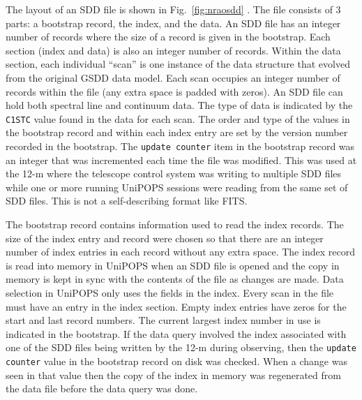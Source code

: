 \documentclass[final,authoryear,5p,times,twocolumn]{elsarticle}
\begin{document}
The layout of an SDD file is shown in Fig.~\ref{fig:nraosdd}
\citep[see also][]{UNIPOPS}.  The file consists of 3 parts: a
bootstrap record, the index, and the data.  An SDD file has an integer
number of records where the size of a record is given in the
bootstrap.  Each section (index and data) is also an integer number of
records.  Within the data section, each individual ``scan'' is one
instance of the data structure that evolved from the original GSDD
data model.  Each scan occupies an integer number of records within
the file (any extra space is padded with zeros).  An SDD file can hold
both spectral line and continuum data.  The type of data is indicated
by the \texttt{C1STC} value found in the data for each scan. The order
and type of the values in the bootstrap record and within each index
entry are set by the version number recorded in the bootstrap.  
The \texttt{update counter} item in the bootstrap record was an integer that
was incremented each time the file was modified.  This was used at the
12-m where the telescope control system was writing to multiple SDD files
while one or more running UniPOPS sessions were reading from the same
set of SDD files.  This is not a self-describing format like FITS.

The bootstrap record contains information used to read the index
records.  The size of the index entry and record were chosen so that
there are an integer number of index entries in each record without
any extra space.  The index record is read into memory in UniPOPS when
an SDD file is opened and the copy in memory is kept in sync with the
contents of the file as changes are made.  Data selection in UniPOPS
only uses the fields in the index.  Every scan in the file must have
an entry in the index section.  Empty index entries have zeros for the
start and last record numbers.  The current largest index number in
use is indicated in the bootstrap.  If the data query involved the
index associated with one of the SDD files being written by the
12-m during observing, then the \texttt{update counter} value in
the bootstrap record on disk was checked.  When a change was seen in that
value then the copy of the index in memory was regenerated from the
data file before the data query was done.
\end{document}
